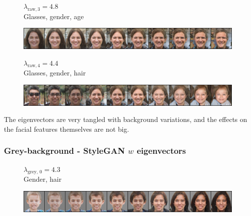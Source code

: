 \documentclass{article}
\begin{document}
\begin{figure}[H]
  \centering
  \begin{minipage}{.18\linewidth}
      \centering
      $\lambda_{\text{raw}, 3} = 4.8$ \\
      Glasses, gender, age
  \end{minipage}%
  \hfill
  \begin{minipage}{.81\linewidth}
      \centering
      \includegraphics[width=\linewidth]{eigen/raw_gan_3.png}
  \end{minipage}
\end{figure}

\begin{figure}[H]
  \centering
  \begin{minipage}{.18\linewidth}
      \centering
      $\lambda_{\text{raw}, 4} = 4.4$ \\
      Glasses, gender, hair
  \end{minipage}%
  \hfill
  \begin{minipage}{.81\linewidth}
      \centering
      \includegraphics[width=\linewidth]{eigen/raw_gan_4.png}
  \end{minipage}
\end{figure}

The eigenvectors are very tangled with background variations, and the effects on the facial features themselves are not big.

\subsubsection*{Grey-background - StyleGAN $w$ eigenvectors}

\begin{figure}[H]
  \centering
  \begin{minipage}{.18\linewidth}
      \centering
      $\lambda_{\text{grey, 0}} = 4.3$ \\
      Gender, hair
  \end{minipage}%
  \hfill
  \begin{minipage}{.81\linewidth}
      \centering
      \includegraphics[width=\linewidth]{eigen/grey_gan_0.png}
  \end{minipage}
\end{figure}
\end{document}
